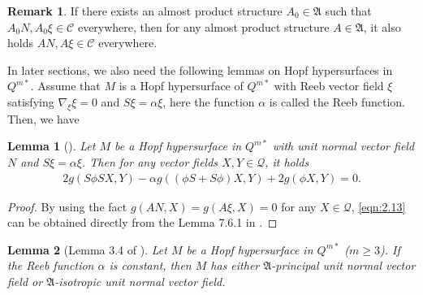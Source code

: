\documentclass[reqno]{amsart}%
\newtheorem{theorem}{Theorem}[section]   %
\newtheorem{lemma}[theorem]{Lemma}
\theoremstyle{definition}
\newtheorem{remark}{Remark}[section]
\numberwithin{equation}{section}
\begin{document}
\begin{remark}\label{rem:2.1}
If there exists an almost product structure $A_0\in\mathfrak{A}$
such that $A_0N,A_0\xi\in \mathcal{C}$ everywhere, then for any almost product structure $A\in\mathfrak{A}$,
it also holds $AN,A\xi\in \mathcal{C}$ everywhere.
\end{remark}



\vskip 1mm
In later sections, we also need the following lemmas on Hopf hypersurfaces in $Q^{m*}$.
Assume that $M$ is a Hopf hypersurface of $Q^{m*}$ with Reeb vector field $\xi$ satisfying
$\nabla_\xi\xi=0$ and $S\xi=\alpha \xi$, here the function $\alpha$ is called the Reeb
function. Then, we have

\begin{lemma}[\cite{BS-2022}]\label{lemma:2.3}
Let $M$ be a Hopf hypersurface in $Q^{m*}$ with unit normal vector field
$N$ and $S\xi=\alpha\xi$. %
%
%
Then for any vector fields $X,Y\in \mathcal{Q}$, it holds
\begin{equation}\label{eqn:2.13}
\begin{aligned}
2g(S\phi SX,Y)-\alpha g((\phi S+S\phi)X,Y)+2g(\phi X,Y)=0.
\end{aligned}
\end{equation}
\end{lemma}

\begin{proof}
By using the fact $g(AN,X)=g(A\xi,X)=0$ for any $X\in \mathcal{Q}$, 
\eqref{eqn:2.13} can be obtained directly from the Lemma 7.6.1 in \cite{BS-2022}.
\end{proof}


\begin{lemma}[Lemma 3.4 of \cite{WLS}]\label{lemma:2.5}
Let $M$ be a Hopf hypersurface in $Q^{m*}$ ($m\geq3$). If the Reeb function $\alpha$ is constant,
then $M$ has either $\mathfrak{A}$-principal unit normal vector field or $\mathfrak{A}$-isotropic unit normal vector field.
\end{lemma}



\end{document}
